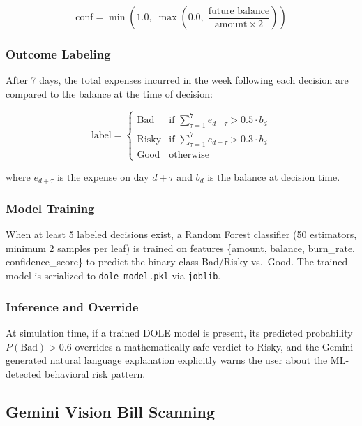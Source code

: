 \documentclass[]{IEEEtran}
\begin{document}
\begin{equation}
\text{conf} = \min\!\left(1.0,\; \max\!\left(0.0,\; \frac{\text{future\_balance}}{\text{amount} \times 2}\right)\right)
\end{equation}

\subsubsection{Outcome Labeling}
After 7 days, the total expenses incurred in the week following each decision are compared to the balance at the time of decision:

\begin{equation}
\text{label} =
\begin{cases}
\text{Bad} & \text{if } \sum_{\tau=1}^{7} e_{d+\tau} > 0.5 \cdot b_d \\
\text{Risky} & \text{if } \sum_{\tau=1}^{7} e_{d+\tau} > 0.3 \cdot b_d \\
\text{Good} & \text{otherwise}
\end{cases}
\end{equation}

where $e_{d+\tau}$ is the expense on day $d+\tau$ and $b_d$ is the balance at decision time.

\subsubsection{Model Training}
When at least 5 labeled decisions exist, a Random Forest classifier (50 estimators, minimum 2 samples per leaf) is trained on features \{amount, balance, burn\_rate, confidence\_score\} to predict the binary class Bad/Risky vs.\ Good. The trained model is serialized to \texttt{dole\_model.pkl} via \texttt{joblib}.

\subsubsection{Inference and Override}
At simulation time, if a trained DOLE model is present, its predicted probability $P(\text{Bad}) > 0.6$ overrides a mathematically safe verdict to Risky, and the Gemini-generated natural language explanation explicitly warns the user about the ML-detected behavioral risk pattern.

\subsection{Gemini Vision Bill Scanning}
\end{document}
